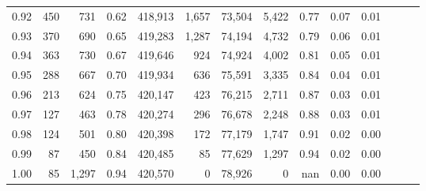 \begin{tabular}{rrrrrrrrrrrrrr}
0.92 &    450 &    731 &  0.62 &  418,913 &    1,657 &  73,504 &   5,422 &  0.77 &  0.07 &      0.01 \\
0.93 &    370 &    690 &  0.65 &  419,283 &    1,287 &  74,194 &   4,732 &  0.79 &  0.06 &      0.01 \\
0.94 &    363 &    730 &  0.67 &  419,646 &      924 &  74,924 &   4,002 &  0.81 &  0.05 &      0.01 \\
0.95 &    288 &    667 &  0.70 &  419,934 &      636 &  75,591 &   3,335 &  0.84 &  0.04 &      0.01 \\
0.96 &    213 &    624 &  0.75 &  420,147 &      423 &  76,215 &   2,711 &  0.87 &  0.03 &      0.01 \\
0.97 &    127 &    463 &  0.78 &  420,274 &      296 &  76,678 &   2,248 &  0.88 &  0.03 &      0.01 \\
0.98 &    124 &    501 &  0.80 &  420,398 &      172 &  77,179 &   1,747 &  0.91 &  0.02 &      0.00 \\
0.99 &     87 &    450 &  0.84 &  420,485 &       85 &  77,629 &   1,297 &  0.94 &  0.02 &      0.00 \\
1.00 &     85 &  1,297 &  0.94 &  420,570 &        0 &  78,926 &       0 &   nan &  0.00 &      0.00 \\
\bottomrule
\end{tabular}
